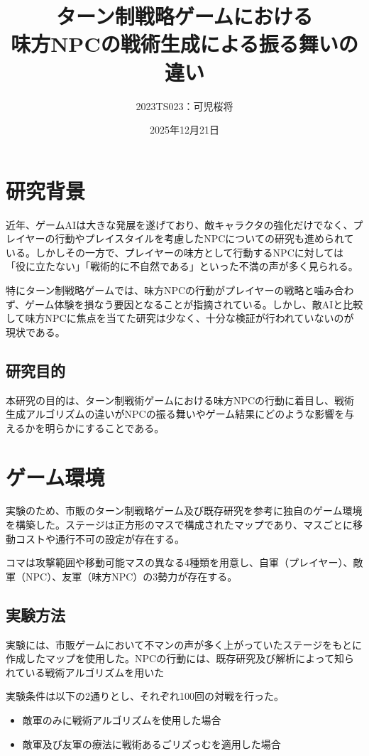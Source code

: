 \documentclass[11pt]{jsarticle}
\title{ターン制戦略ゲームにおける\\味方NPCの戦術生成による振る舞いの違い}
\author{2023TS023：可児桜将}
\date{2025年12月21日}
\begin{document}
\maketitle

\section{研究背景}
近年、ゲームAIは大きな発展を遂げており、敵キャラクタの強化だけでなく、プレイヤーの行動やプレイスタイルを考慮したNPCについての研究も進められている。しかしその一方で、プレイヤーの味方として行動するNPCに対しては「役に立たない」「戦術的に不自然である」といった不満の声が多く見られる。

特にターン制戦略ゲームでは、味方NPCの行動がプレイヤーの戦略と噛み合わず、ゲーム体験を損なう要因となることが指摘されている。しかし、敵AIと比較して味方NPCに焦点を当てた研究は少なく、十分な検証が行われていないのが現状である。
\subsection{研究目的}
本研究の目的は、ターン制戦術ゲームにおける味方NPCの行動に着目し、戦術生成アルゴリズムの違いがNPCの振る舞いやゲーム結果にどのような影響を与えるかを明らかにすることである。

\section{ゲーム環境}
実験のため、市販のターン制戦略ゲーム及び既存研究を参考に独自のゲーム環境を構築した。ステージは正方形のマスで構成されたマップであり、マスごとに移動コストや通行不可の設定が存在する。

コマは攻撃範囲や移動可能マスの異なる4種類を用意し、自軍（プレイヤー）、敵軍（NPC）、友軍（味方NPC）の3勢力が存在する。

\subsection{実験方法}
実験には、市販ゲームにおいて不マンの声が多く上がっていたステージをもとに作成したマップを使用した。NPCの行動には、既存研究及び解析によって知られている戦術アルゴリズムを用いた

実験条件は以下の2通りとし、それぞれ100回の対戦を行った。
\begin{itemize}
\item 敵軍のみに戦術アルゴリズムを使用した場合
\item 敵軍及び友軍の療法に戦術あるごリズっむを適用した場合
\end{itemize}
\end{document}
